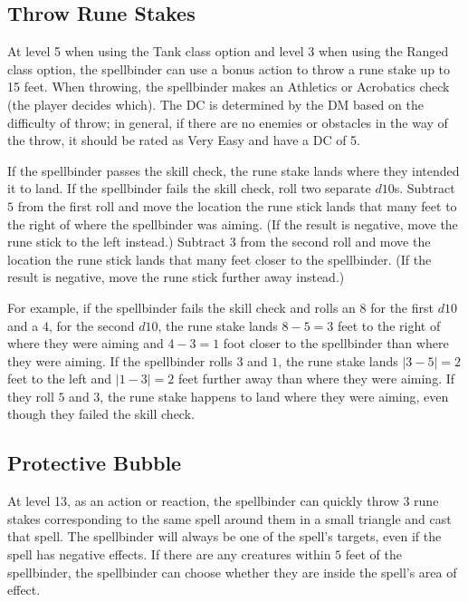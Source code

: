 \subsection{Throw Rune Stakes}
\label{ability:throw-rune-stakes}
At level 5 when using the Tank class option and level 3 when using the Ranged class option, the spellbinder can use a bonus action to throw a rune stake up to 15 feet. When throwing, the spellbinder makes an Athletics or Acrobatics check (the player decides which). The DC is determined by the DM based on the difficulty of throw; in general, if there are no enemies or obstacles in the way of the throw, it should be rated as Very Easy and have a DC of 5.

If the spellbinder passes the skill check, the rune stake lands where they intended it to land. If the spellbinder fails the skill check, roll two separate $d10$s. Subtract $5$ from the first roll and move the location the rune stick lands that many feet to the right of where the spellbinder was aiming. (If the result is negative, move the rune stick to the left instead.) Subtract $3$ from the second roll and move the location the rune stick lands that many feet closer to the spellbinder. (If the result is negative, move the rune stick further away instead.)

For example, if the spellbinder fails the skill check and rolls an $8$ for the first $d10$ and a $4$, for the second $d10$, the rune stake lands $8-5=3$ feet to the right of where they were aiming and $4-3=1$ foot closer to the spellbinder than where they were aiming. If the spellbinder rolls $3$ and $1$, the rune stake lands $|3-5|=2$ feet to the left and $|1-3|=2$ feet further away than where they were aiming. If they roll $5$ and $3$, the rune stake happens to land where they were aiming, even though they failed the skill check.

\subsection{Protective Bubble}
At level 13, as an action or reaction, the spellbinder can quickly throw $3$ rune stakes corresponding to the same spell around them in a small triangle and cast that spell. The spellbinder will always be one of the spell's targets, even if the spell has negative effects. If there are any creatures within $5$ feet of the spellbinder, the spellbinder can choose whether they are inside the spell's area of effect.

